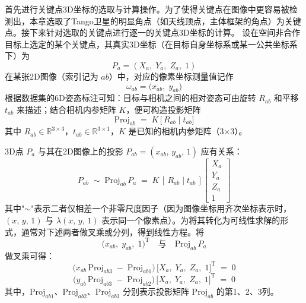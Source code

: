 首先进行关键点3D坐标的选取与计算操作。为了使得关键点在图像中更容易被检测出，本章选取了Tango卫星的明显角点（如天线顶点，主体框架的角点）为关键点。接下来针对选取的关键点进行逐一的关键点3D坐标的计算。
设在空间非合作目标上选定的某个关键点，其真实3D坐标（在目标自身坐标系或某一公共坐标系下）为
\begin{equation}
	P_a = (X_a,\; Y_a,\; Z_a,\; 1)
\end{equation}
在某张2D图像（索引记为 $ab$）中，对应的像素坐标测量值记作
\begin{equation}
	\omega_{ab} = \bigl(x_{ab},\; y_{ab}\bigr)
\end{equation}
根据数据集的6D姿态标注可知：目标与相机之间的相对姿态可由旋转 $R_{ab}$ 和平移 $t_{ab}$ 来描述；结合相机内参矩阵 $K$，便可构造投影矩阵
\begin{equation}\label{eq:proj_ab_def}
	\mathrm{Proj}_{ab} \;=\; K\,\bigl[\,R_{ab}\;\big\vert\;t_{ab}\bigr]
\end{equation}
其中 $R_{ab}\in\mathbb{R}^{3\times 3}$，$t_{ab}\in\mathbb{R}^{3\times 1}$，$K$ 是已知的相机内参矩阵（3$\times$3）。

3D点 $P_a$ 与其在2D图像上的投影 $P_{ab} = (x_{ab},\,y_{ab},\,1)$ 应有关系：
\begin{equation}
	P_{ab} 
	\;\sim\; 
	\mathrm{Proj}_{ab}\,P_a
	\;=\;
	K\,[\,R_{ab}\mid t_{ab}\,] 
	\begin{bmatrix}
		X_a\\[4pt]
		Y_a\\[4pt]
		Z_a\\[4pt]
		1
	\end{bmatrix}
\end{equation}
其中"$\sim$"表示二者仅相差一个非零尺度因子（因为图像坐标用齐次坐标表示时，$(x,\,y,\,1)$ 与 $\lambda(x,\,y,\,1)$ 表示同一个像素点）。为将其转化为可线性求解的形式，通常对下述两者做叉乘或分列，得到线性方程。将
\begin{equation}
	\bigl(x_{ab},\;y_{ab},\;1\bigr)^\mathrm{T}
	\quad\text{与}\quad 
	\mathrm{Proj}_{ab}\,P_a
\end{equation}
做叉乘可得：
\begin{equation}
	\bigl(x_{ab}\,\mathrm{Proj}_{ab3} \;-\; \mathrm{Proj}_{ab1}\bigr)\,\bigl[X_a,\;Y_a,\;Z_a,\;1\bigr]^\mathrm{T} \;=\; 0
\end{equation}
\begin{equation}
	\bigl(y_{ab}\,\mathrm{Proj}_{ab3} \;-\; \mathrm{Proj}_{ab2}\bigr)\,\bigl[X_a,\;Y_a,\;Z_a,\;1\bigr]^\mathrm{T} \;=\; 0
\end{equation}
其中，$\mathrm{Proj}_{ab1}$、$\mathrm{Proj}_{ab2}$、$\mathrm{Proj}_{ab3}$ 分别表示投影矩阵 $\mathrm{Proj}_{ab}$ 的第1、2、3列。

